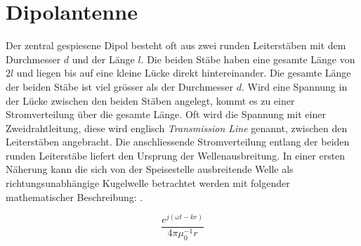 
\section{Dipolantenne}\label{sec:DipolAntenne}
Der zentral gespiesene Dipol besteht oft aus zwei runden Leiterstäben mit dem Durchmesser $d$ und der Länge $l$. Die beiden Stäbe haben eine gesamte Länge von $2l$ und liegen bis auf eine kleine Lücke direkt hintereinander. Die gesamte Länge der beiden Stäbe ist viel grösser als der Durchmesser $d$. Wird eine Spannung in der Lücke zwischen den beiden Stäben angelegt, kommt es zu einer Stromverteilung über die gesamte Länge. Oft wird die Spannung mit einer Zweidrahtleitung,  diese wird englisch \textit{Transmission Line} genannt, zwischen den Leiterstäben angebracht. Die anschliessende Stromverteilung entlang der beiden runden Leiterstäbe liefert den Ursprung der Wellenausbreitung. In einer ersten Näherung kann die sich von der Speisestelle ausbreitende Welle als richtungsunabhängige Kugelwelle betrachtet werden mit folgender mathematischer Beschreibung: \cite{elliott1981antenna}.

\begin{equation}\label{term:Kugelwelle}
\frac{e^{j(\omega t-kr)}}{4\pi \mu_{0}^{-1}r}
\end{equation}

